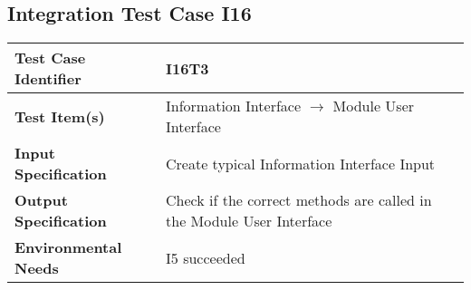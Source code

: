 \subsection{Integration Test Case I16}
\begin{tabular}{l p{9cm}}
	\hline
	\textbf{Test	Case Identifier} & I16T3 \\ \hline
	\textbf{Test	Item(s)} & Information Interface $\rightarrow$ Module User Interface \\ \hline
	\textbf{Input Specification} & Create typical Information Interface Input\\ \hline
	\textbf{Output Specification} & Check if the correct methods are called in the Module User Interface \\ \hline
	\textbf{Environmental Needs} & I5 succeeded \\ \hline
\end{tabular}
